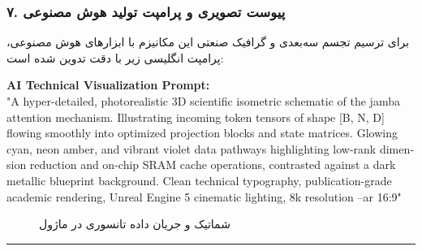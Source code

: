 \subsubsection*{۷. پیوست تصویری و پرامپت تولید هوش مصنوعی}
برای ترسیم تجسم سه‌بعدی و گرافیک صنعتی این مکانیزم با ابزارهای هوش مصنوعی، پرامپت انگلیسی زیر با دقت تدوین شده است:

\vspace{0.2cm}
\begin{latin}
\footnotesize
\textbf{AI Technical Visualization Prompt:}\\
"A hyper-detailed, photorealistic 3D scientific isometric schematic of the jamba attention mechanism. Illustrating incoming token tensors of shape [B, N, D] flowing smoothly into optimized projection blocks and state matrices. Glowing cyan, neon amber, and vibrant violet data pathways highlighting low-rank dimension reduction and on-chip SRAM cache operations, contrasted against a dark metallic blueprint background. Clean technical typography, publication-grade academic rendering, Unreal Engine 5 cinematic lighting, 8k resolution --ar 16:9"
\end{latin}

\begin{figure}[H]
    \centering
    \caption{شماتیک و جریان داده تانسوری در ماژول }
    \label{fig:jamba}
\end{figure}

\vspace{0.5cm}
\hrule
\vspace{0.5cm}
